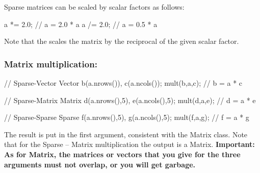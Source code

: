 Sparse matrices can be scaled by scalar factors as follows:
%
\begin{code}
a *= 2.0;  // a = 2.0 * a
a /= 2.0;  // a = 0.5 * a
\end{code}
%
Note that the \shortcode{/=} scales the matrix by the reciprocal of the
given scalar factor.

\subsubsection{Matrix multiplication:}
\begin{code}
// Sparse-Vector
Vector b(a.nrows()), c(a.ncols());
mult(b,a,c);        // b = a * c

// Sparse-Matrix
Matrix d(a.nrows(),5), e(a.ncols(),5);
mult(d,a,e);        // d = a * e

// Sparse-Sparse
Sparse f(a.nrows(),5), g(a.ncols(),5);
mult(f,a,g);        // f = a * g
\end{code}
The result is put in the first argument, consistent with the Matrix class.
Note that for the Sparse -- Matrix multiplication the output is a Matrix.
\textbf{Important: As for Matrix, the matrices or vectors
that you give for the three arguments must not overlap, or you will get
garbage.}





